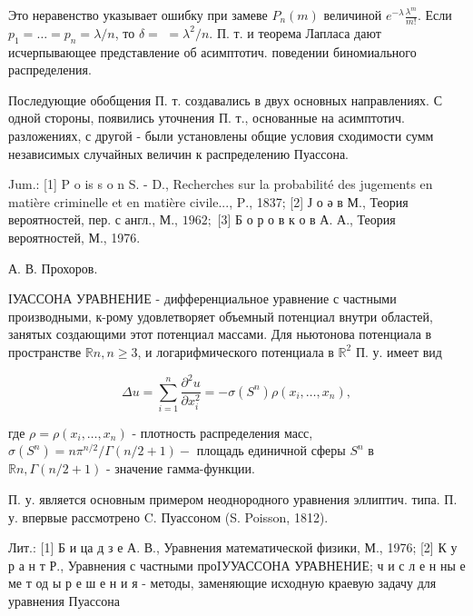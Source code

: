\documentclass[10pt]{article}
\begin{document}
Это неравенство указывает ошибку при замеве $P_{n}(m)$ величиной $e^{-\lambda} \frac{\lambda^{m}}{m !}$. Если $p_{1}=\ldots=p_{n}=\lambda / n$, то $\delta=$ $=\lambda^{2} / n$. П. т. и теорема Лапласа дают исчерпывающее представление об асимптотич. поведении биномиального распределения.



Последующие обобщения П. т. создавались в двух основных направлениях. С одной стороны, появились уточнения П. т., основанные на асимптотич. разложениях, с другой - были установлены общие условия сходимости сумм независимых случайных величин к распределению Пуассона.



Jum.: [1] P o is s o n S. - D., Recherches sur la probabilité des jugements en matière criminelle et en matière civile..., $\mathrm{P}$., 1837; [2] Ј о ә в М., Теория вероятностей, пер. с англ., М., $1962 ;$ [3] Б о р о в к о в А. А., Теория вероятностей, М., 1976.

А. В. Прохоров.



ІУАССОНА УРАВНЕНИЕ - дифференциальное уравнение с частными производными, к-рому удовлетворяет объемный потенциал внутри областей, занятых создающими этот потенциал массами. Для ньютонова потенциала в пространстве $\mathbb{R} n, n \geqslant 3$, и логарифмического потенциала в $\mathbb{R}^{2}$ П. у. имеет вид



\[

\Delta u=\sum_{i=1}^{n} \frac{\partial^{2} u}{\partial x_{i}^{2}}=-\sigma\left(S^{n}\right) \rho\left(x_{i}, \ldots, x_{n}\right),

\]



где $\rho=\rho\left(x_{i}, \ldots, x_{n}\right)$ - плотность распределения масс, $\sigma\left(S^{n}\right)=n \pi^{n / 2} / \Gamma(n / 2+1)-$ площадь единичной сферы $S^{n}$ в $\mathbb{R} n, \Gamma(n / 2+1)$ - значение гамма-функции.



П. у. является основным примером неоднородного уравнения эллиптич. типа. П. у. впервые рассмотрено C. Пуассоном (S. Poisson, 1812).



Лит.: [1] Б и ца д з е А. В., Уравнения математической физики, М., 1976; [2] К у р а н т Р., Уравнения с частными проIУУАССОНА УРАВНЕНИЕ; ч и с л е н ны е ме т од ы р е ш е н и я - методы, заменяющие исходную краевую задачу для уравнения Пуассона
\end{document}
